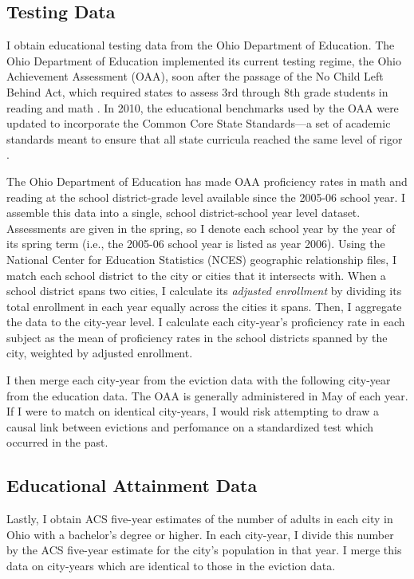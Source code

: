 \documentclass[12pt]{article}
\begin{document}
\subsection{Testing Data}
I obtain educational testing data from the Ohio Department of Education. The Ohio Department of Education implemented its current testing regime, the Ohio Achievement Assessment (OAA), soon after the passage of the No Child Left Behind Act, which required states to assess 3rd through 8th grade students in reading and math \citep{fox_examination_2014}. In 2010, the educational benchmarks used by the OAA were updated to incorporate the Common Core State Standards—a set of academic standards meant to ensure that all state curricula reached the same level of rigor \citep{ohio_school_boards_association_ohios_2010}.

The Ohio Department of Education has made OAA proficiency rates in math and reading at the school district-grade level available since the 2005-06 school year. I assemble this data into a single, school district-school year level dataset. Assessments are given in the spring, so I denote each school year by the year of its spring term (i.e., the 2005-06 school year is listed as year 2006). Using the National Center for Education Statistics (NCES) geographic relationship files, I match each school district to the city or cities that it intersects with. When a school district spans two cities, I calculate its \textit{adjusted enrollment} by dividing its total enrollment in each year equally across the cities it spans. Then, I aggregate the data to the city-year level. I calculate each city-year's proficiency rate in each subject as the mean of proficiency rates in the school districts spanned by the city, weighted by adjusted enrollment.

I then merge each city-year from the eviction data with the following city-year from the education data. The OAA is generally administered in May of each year. If I were to match on identical city-years, I would risk attempting to draw a causal link between evictions and perfomance on a standardized test which occurred in the past.

\subsection{Educational Attainment Data}
Lastly, I obtain ACS five-year estimates of the number of adults in each city in Ohio with a bachelor's degree or higher. In each city-year, I divide this number by the ACS five-year estimate for the city's population in that year. I merge this data on city-years which are identical to those in the eviction data.
\end{document}

